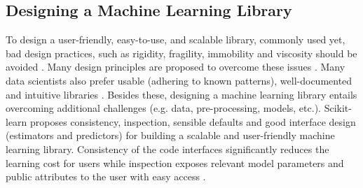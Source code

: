 \documentclass[letterpaper]{article} %
\begin{document}
\subsection{Designing a Machine Learning Library}

To design a user-friendly, easy-to-use, and scalable library, commonly used yet, bad design practices, such as rigidity, fragility, immobility and viscosity should be avoided \cite{martin2000design,piccioni2013empirical}. 
Many design principles are proposed to overcome these issues \cite{gamma1995design}. Many data scientists also prefer usable (adhering to known patterns), well-documented and intuitive libraries \cite{nadi2023selecting}.
Besides these, designing a machine learning library entails overcoming additional challenges (e.g. data, pre-processing, models, etc.).
Scikit-learn \cite{pedregosa2011scikit} proposes consistency, inspection, sensible defaults and good interface design (estimators and predictors) for building a scalable and user-friendly machine learning library. Consistency of the code interfaces significantly reduces the learning cost for users while inspection exposes relevant model parameters and public attributes to the user with easy access \cite{buitinck2013api}.
\end{document}
